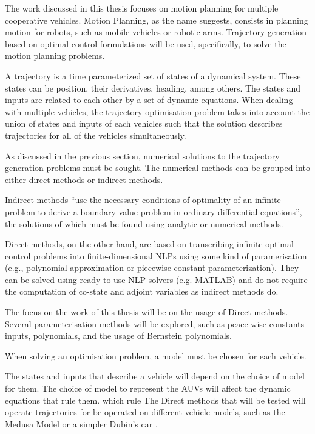 \par The work discussed in this thesis focuses on motion planning for multiple cooperative vehicles. Motion Planning, as the name suggests, consists in planning motion for robots, such as mobile vehicles or robotic arms. Trajectory generation based on optimal control formulations will be used, specifically, to solve the motion planning problems. 
\par A trajectory is a time parameterized set of states of a dynamical system. These states can be position, their derivatives, heading, among others. The states and inputs are related to each other by a set of dynamic equations. When dealing with multiple vehicles, the trajectory optimisation problem takes into account the union of states and inputs of each vehicles such that the solution describes trajectories for all of the vehicles simultaneously.
\par As discussed in the previous section, numerical solutions to the trajectory generation problems must be sought. The numerical methods can be grouped into either direct methods or indirect methods. 
\par Indirect methods “use the necessary conditions of optimality of an infinite problem to derive a boundary value problem in ordinary differential equations”, the solutions of which must be found using analytic or numerical methods. 
\par Direct methods, on the other hand, are based on transcribing infinite optimal control problems into finite-dimensional \acp{NLP} using some kind of paramerisation (e.g., polynomial approximation or piecewise constant parameterization). They can be solved using ready-to-use NLP solvers (e.g. MATLAB) and do not require the computation of co-state and adjoint variables as indirect methods do.
\par The focus on the work of this thesis will be on the usage of Direct methods. Several parameterisation methods will be explored, such as peace-wise constants inputs, polynomials, and the usage of Bernstein polynomials.
\par When solving an optimisation problem, a model must be chosen for each vehicle. 
\par The states and inputs that describe a vehicle will depend on the choice of model for them. The choice of model to represent the \acp{AUV} will affect the dynamic equations that rule them.    which rule The Direct methods that will be tested will operate trajectories for be operated on different vehicle models, such as the Medusa Model \cite{abreu2016medusa} or a simpler Dubin's car \cite{wiki:dubincar}.

